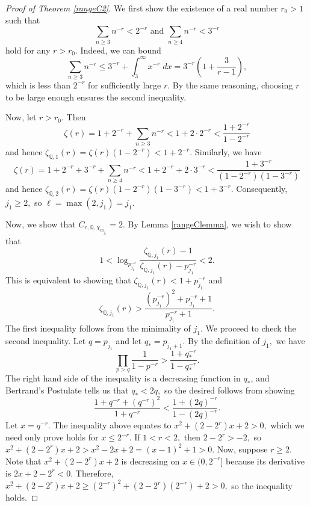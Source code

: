 \documentclass[12pt]{amsart}
\theoremstyle{definition}
\numberwithin{equation}{section}
\newcommand{\Q}{\mathbb{Q}}
\begin{document}
\begin{proof}[Proof of Theorem \ref{rangeC2}]
    We first show the existence of a real number $r_0 > 1$ such that $$\sum_{n \geq 3} n^{-r} < 2^{-r} \text{ and } \sum_{n\geq 4} n^{-r} < 3^{-r}$$ hold for any $r > r_0.$ Indeed, we can bound $$\sum_{n \geq 3} n^{-r} \leq 3^{-r} + \int_3^\infty x^{-r} \; dx = 3^{-r} \left(1 + \frac{3}{r-1} \right),$$ which is less than $2^{-r}$ for sufficiently large $r$. By the same reasoning, choosing $r$ to be large enough ensures the second inequality. 

    Now, let $r > r_0.$ Then $$\zeta(r) = 1 + 2^{-r} + \sum_{n \geq 3} n^{-r} < 1 + 2 \cdot 2^{-r} < \frac{1+2^{-r}}{1-2^{-r}}$$ and hence $\zeta_{\Q,1}(r) = \zeta(r)(1-2^{-r}) < 1 + 2^{-r}.$ Similarly, we have $$\zeta(r) = 1 + 2^{-r} + 3^{-r} + \sum_{n \geq 4} n^{-r} < 1 + 2^{-r} + 2 \cdot 3^{-r} < \frac{1+3^{-r}}{(1-2^{-r})(1-3^{-r})}$$ and hence $\zeta_{\Q,2}(r) = \zeta(r)(1-2^{-r})(1-3^{-r}) < 1+3^{-r}.$ Consequently, $j_1 \geq 2,$  so $\ell = \max(2,j_1) = j_1.$





    Now, we show that $C_{r,\Q,\chi_{m_{j_1}}} = 2$.  By Lemma \ref{rangeClemma}, we wish to show that $$1 < \log_{p_{j_1}^{-r}} \frac{\zeta_{\Q,j_1}(r)-1}{\zeta_{\Q,j_1}(r) - p_{j_1}^{-r}} < 2.$$ This is equivalent to showing that $\zeta_{\Q,j_1}(r) < 1 + p_{j_1}^{-r}$ and $$\zeta_{\Q,j_1}(r) > \frac{(p_{j_1}^{-r})^2 + p_{j_1}^{-r} + 1}{p_{j_1}^{-r} + 1}.$$ The first inequality follows from the minimality of $j_1$. We proceed to check the second inequality. Let $q = p_{j_1}$ and let $q_* = p_{j_1+1}$. By the definition of $j_1,$ we have $$\prod_{p > q} \frac{1}{1-p^{-r}} > \frac{1 + q_*^{-r}}{1 - q_*^{-r}}.$$ The right hand side of the inequality is a decreasing function in $q_*$, and Bertrand's Postulate tells us that $q_* < 2q,$ so the desired follows from showing $$\frac{1+q^{-r} + (q^{-r})^2}{1 + q^{-r}} < \frac{1 + (2q)^{-r}}{1 - (2q)^{-r}}.$$ Let $x = q^{-r}.$ The inequality above equates to $x^2 + (2-2^r)x + 2 > 0,$ which we need only prove holds for $x \leq 2^{-r}.$ If $1 < r < 2,$ then $2 - 2^r > -2,$ so $x^2 + (2-2^r)x + 2 > x^2 - 2x+ 2 = (x-1)^2 + 1 > 0.$ Now, suppose $r \geq 2.$ Note that $x^2 + (2-2^r)x + 2$ is decreasing on $x \in (0,2^{-r}]$ because its derivative is $2x + 2 - 2^r < 0.$ Therefore, $x^2 + (2-2^r)x + 2 \geq (2^{-r})^2 + (2-2^r)(2^{-r}) + 2 > 0,$ so the inequality holds. 


\end{proof}
\end{document}

